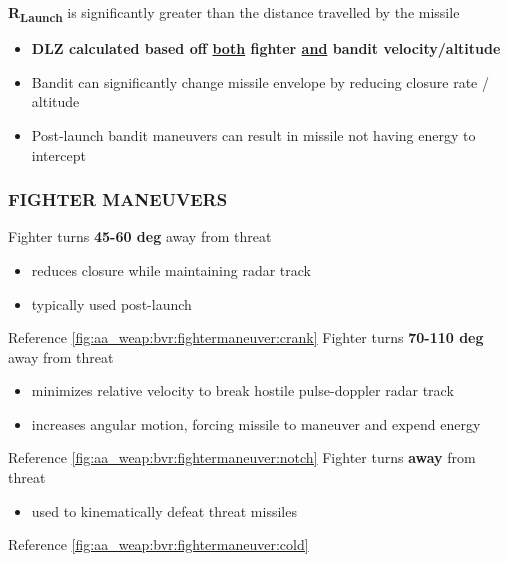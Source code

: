 \begin{tcoloritemize}
   \textbf{R\textsubscript{Launch}} is significantly greater than the distance travelled by the missile
    \begin{itemize}
        \item \textbf{DLZ calculated based off \underline{both} fighter \underline{and} bandit velocity/altitude}
        \item Bandit can significantly change missile envelope by reducing closure rate / altitude
        \item Post-launch bandit maneuvers can result in missile not having energy to intercept
    \end{itemize}
\end{tcoloritemize}

\clearpage

\subsubsection{FIGHTER MANEUVERS}

\begin{tcoloritemize}
    \blueitem[Crank]
    Fighter turns \textbf{45-60 deg} away from threat 

    \begin{itemize}
        \item reduces closure while maintaining radar track
        \item typically used post-launch
    \end{itemize}
    
    Reference \cref{fig:aa_weap:bvr:fightermaneuver:crank}
    \blueitem[Notch]
    Fighter turns \textbf{70-110 deg} away from threat

    \begin{itemize}
        \item minimizes relative velocity to break hostile pulse-doppler radar track
        \item increases angular motion, forcing missile to maneuver and expend energy
    \end{itemize}
    
    Reference \cref{fig:aa_weap:bvr:fightermaneuver:notch}
    \blueitem[Go Cold]
    Fighter turns \textbf{away} from threat

    \begin{itemize}
        \item used to kinematically defeat threat missiles
    \end{itemize}
    
    Reference \cref{fig:aa_weap:bvr:fightermaneuver:cold}
\end{tcoloritemize}

